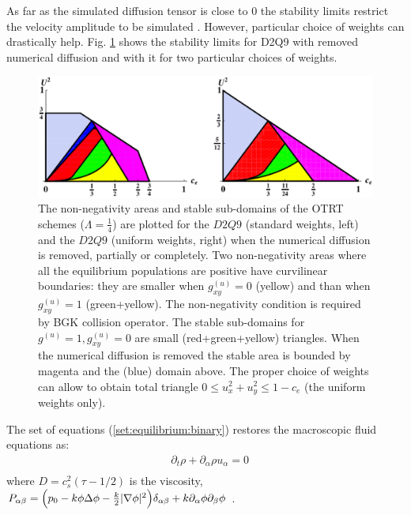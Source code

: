 \documentclass{article}
\begin{document}
As far as the simulated diffusion tensor is close to $0$ the stability limits restrict the velocity
amplitude to be simulated \cite{kuzmin-stability-optimal}. However, particular choice of weights
can drastically help. Fig. \ref{stability:d2q9} shows the stability limits for D2Q9 with removed
numerical diffusion and with it for two particular choices of weights.
\begin{figure}[htb!]
\includegraphics[width=\textwidth]{Figures/d2q9_stability.eps}
\caption{The non-negativity areas and stable sub-domains of the OTRT schemes ($\Lambda=\frac{1}{4}$)
are plotted for the $D2Q9$ (standard weights, left) and the $D2Q9$ (uniform weights, right) when the
numerical diffusion is removed, partially or completely. Two non-negativity areas where all the
equilibrium populations are positive have curvilinear boundaries: they are smaller when
$g^{(u)}_{xy}=0$ (yellow) and than when $g^{(u)}_{xy}=1$ (green+yellow). The non-negativity
condition is required by BGK collision operator. The stable sub-domains for $g^{(u)} = 1,
g^{(u)}_{xy} = 0$ are small (red+green+yellow) triangles. When the numerical diffusion is removed
the stable area is bounded by magenta and the (blue) domain above. The proper choice of weights can
allow to obtain  total triangle $0 \leq u_x^2+u_y^2 \leq 1−c_e$ (the
uniform weights only).
\label{stability:d2q9}}
\end{figure}

The set of equations (\ref{set:equilibrium:binary}) restores the
macroscopic
fluid equations as:
\begin{equation}
\begin{aligned}
&\partial_t \rho+ \partial_{\alpha} \rho u_{\alpha}=0\\
\end{aligned}
\label{advection:diffusion:equation}
\end{equation}
where $D=c_s^2 (\tau-1/2)$ is the viscosity, 
$P_{\alpha\beta}=\Bigl(p_0-k\phi \Delta \phi -\frac{k}{2}|\nabla \phi|^2\Bigr)\delta_{\alpha\beta}
+ k \partial_{\alpha} \phi \partial_{\beta} \phi$  \cite{pooley-contact}.
\end{document}
